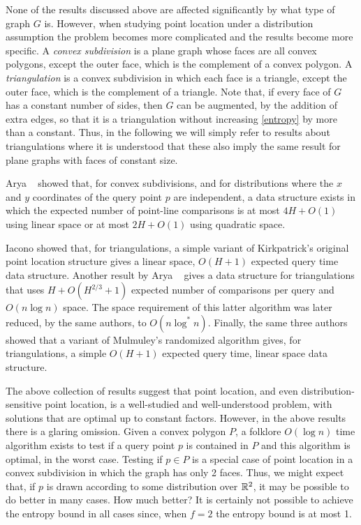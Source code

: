 \documentclass[charterfonts,lotsofwhite]{patmorin}
\begin{document}
None of the results discussed above are affected significantly by what
type of graph $G$ is.  However, when studying point location under a
distribution assumption the problem becomes more complicated and the
results become more specific.  A \emph{convex subdivision} is a plane
graph whose faces are all convex polygons, except the outer face,
which is the complement of a convex polygon.  A \emph{triangulation}
is a convex subdivision in which each face is a triangle, except the
outer face, which is the complement of a triangle.  Note that, if
every face of $G$ has a constant number of sides, then $G$ can be
augmented, by the addition of extra edges, so that it is a
triangulation without increasing \eqref{entropy} by more than a
constant.  Thus, in the following we will simply refer to results
about triangulations where it is understood that these also imply the
same result for plane graphs with faces of constant size.

Arya \etal\ \cite{XXX} showed that, for convex subdivisions, and for
distributions where the $x$ and $y$ coordinates of the query point $p$ are
independent, a data structure exists in which the expected number of
point-line comparisons is at most $4H+O(1)$ using linear space or at
most $2H+O(1)$ using quadratic space.

Iacono \cite{iXX} showed that, for triangulations, a simple variant of
Kirkpatrick's original point location structure gives a linear space,
$O(H+1)$ expected query time data structure.  Another result by Arya
\etal\ \cite{ammXX} gives a data structure for triangulations that
uses $H + O(H^{2/3}+1)$ expected number of comparisons per query and
$O(n\log n)$ space.  The space requirement of this latter algorithm
was later reduced, by the same authors, to $O(n\log^* n)$.  Finally,
the same three authors \cite{ammXX} showed that a variant of
Mulmuley's randomized algorithm gives, for triangulations, a simple
$O(H+1)$ expected query time, linear space data structure. 

The above collection of results suggest that point location, and even
distribution-sensitive point location, is a well-studied and
well-understood problem, with solutions that are optimal up to
constant factors.   However, in the above results there is a glaring
omission.  Given a convex polygon $P$, a folklore $O(\log n)$ time
algorithm exists to test if a query point $p$ is contained in $P$ and
this algorithm is optimal, in the worst case.  Testing if $p\in P$ is
a special case of point location in a convex subdivision in which the
graph has only 2 faces.  Thus, we might expect that, if $p$ is drawn
according to some distribution over $\mathbb{R}^2$, it may be possible to do
better in many cases. How much better?  It is certainly not possible
to achieve the entropy bound in all cases since, when $f=2$ the
entropy bound is at most 1.
\end{document}

